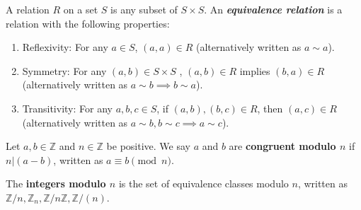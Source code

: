 \documentclass [12pt] {article}
\newcommand{\Z}{\mathbb{Z}}
\newenvironment{definition}[1]{\begin{tcolorbox}[title={Definition: #1},colback=blue!5!white,colframe=black!75!blue]}{\end{tcolorbox}}
\renewcommand{\bf}[1]{\textbf{{#1}}}
\newcommand{\ib}[1]{\textit{\textbf{{#1}}}}
\begin{document}
\begin{definition}{Equivalence Relation}
    A relation $R$ on a set $S$ is any subset of $S \times S$.
    An \ib{equivalence relation} is a relation with the following properties:
    \begin{enumerate}
        \item Reflexivity: For any $a \in S$, $(a, a) \in R$ (alternatively written as $a \sim a$).
        \item Symmetry: For any $(a, b) \in S \times S$ , $(a, b) \in R$ implies $(b, a) \in R$
            (alternatively written as $a \sim b \implies b \sim a$).
        \item Transitivity: For any $a, b, c \in S$, if $(a, b), (b, c) \in R$, then $(a, c) \in R$ 
            (alternatively written as $a \sim b, b \sim c \implies a \sim c$).
    \end{enumerate}
\end{definition}

\begin{definition}{Congruent Modulo $n$}
    Let $a, b \in \Z$ and $n \in \Z$ be positive. We say $a$ and $b$ are \bf{congruent modulo $n$}
    if $n | (a - b)$, written as $a \equiv b \pmod{n}$.
    \vspace{1em}

    The \bf{integers modulo $n$} is the set of equivalence classes modulo $n$, written as
    $\Z/n, \Z_n, \Z/n\Z, \Z/(n)$.
\end{definition}
\end{document}
